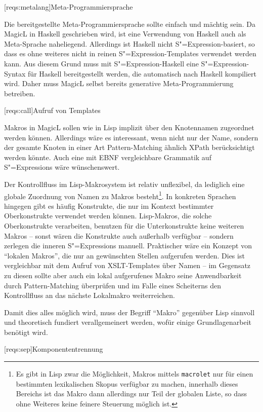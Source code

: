 \documentclass[12pt, a4paper, bibgerm]{scrbook}
\newcommand\icode[1]{\lstinline?#1?}
\newcommand\lsection{}
\newcommand{\sexp}{S"=Expression}
\newcommand{\sexps}{S"=Expressions}
\begin{document}
\lsection[reqs:metalang]{Meta-Programmiersprache}

Die bereitgestellte Meta-Programmiersprache sollte einfach und mächtig
sein. Da MagicL in Haskell geschrieben wird, ist eine Verwendung von
Haskell auch als Meta-Sprache naheliegend. Allerdings ist Haskell nicht
\sexp{}-basiert, so dass es ohne weiteres nicht in reinen
\sexp{}-Templates verwendet werden kann. Aus diesem Grund muss mit
\sexp{}-Haskell eine \sexp{}-Syntax für Haskell bereitgestellt werden,
die automatisch nach Haskell kompiliert wird. Daher muss MagicL selbst
bereits generative Meta-Programmierung betreiben.

\lsection[reqs:call]{Aufruf von Templates}

Makros in MagicL sollen wie in Lisp implizit über den Knotennamen
zugeordnet werden können. Allerdings wäre es interessant, wenn nicht nur
der Name, sondern der gesamte Knoten in einer Art Pattern-Matching
ähnlich XPath berücksichtigt werden könnte. Auch eine mit EBNF
\cite[S.43f]{EBNF} vergleichbare Grammatik auf \sexps{} wäre
wünschenswert. 

Der Kontrollfluss im Lisp-Makrosystem ist relativ unflexibel,
da lediglich eine globale Zuordnung von Namen zu Makros
besteht\footnote{Es gibt in Lisp zwar die Möglichkeit, Makros mittels
  \icode{macrolet} nur für einen bestimmten lexikalischen Skopus
  verfügbar zu machen, innerhalb dieses Bereichs ist das Makro dann
  allerdings nur Teil der globalen Liste, so dass ohne Weiteres keine
  feinere Steuerung möglich ist.}. In konkreten Sprachen hingegen gibt
es häufig Konstrukte, die nur im Kontext bestimmter Oberkonstrukte
verwendet werden können. Lisp-Makros, die solche Oberkonstrukte
verarbeiten, benutzen für die Unterkonstrukte keine weiteren Makros --
sonst wären die Konstrukte auch außerhalb verfügbar -- sondern zerlegen
die inneren \sexps{} manuell. Praktischer wäre ein Konzept von "`lokalen
Makros"', die nur an gewünschten Stellen aufgerufen werden. Dies ist
vergleichbar mit dem Aufruf von XSLT-Templates über Namen -- im Gegensatz
zu diesen sollte aber auch ein lokal aufgerufenes Makro seine
Anwendbarkeit durch Pattern-Matching überprüfen und im Falle eines
Scheiterns den Kontrollfluss an das nächste Lokalmakro weiterreichen.

Damit dies alles möglich wird, muss der Begriff ``Makro'' gegenüber Lisp
sinnvoll und theoretisch fundiert verallgemeinert werden, wofür einige
Grundlagenarbeit benötigt wird.

\lsection[reqs:sep]{Komponententrennung}
\end{document}
